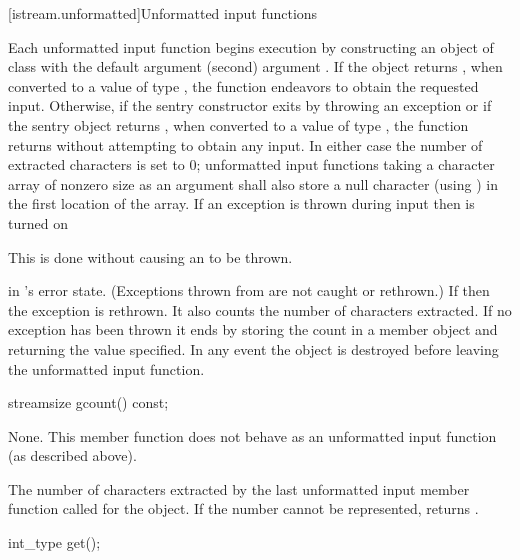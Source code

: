 [istream.unformatted]{Unformatted input functions}

\pnum
Each unformatted input function begins execution by constructing an object of class
with the default argument
(second) argument
.
If the
object returns
,
when converted to a value of type
,
the function endeavors
to obtain the requested input.
Otherwise, if the sentry constructor exits by throwing an exception or if
the sentry object returns , when converted to a value of type
,
the function returns without attempting to obtain any input.
In either case the number of extracted characters is set to 0;
unformatted input functions taking a character array of nonzero size as
an argument shall also store a null character (using
)
in the first location of the array.
If an exception is thrown during input then
is turned on
\begin{footnote}
This is done without causing an
to be thrown.
\end{footnote}
in
's
error state.
(Exceptions thrown from
are not caught or rethrown.)
If
then the exception is rethrown.
It also counts the number of characters extracted.
If no exception has been thrown it ends
by storing the count in a member object
and returning the value specified.
In any event the
object
is destroyed before leaving the unformatted input function.

%
\begin{itemdecl}
streamsize gcount() const;
\end{itemdecl}

\begin{itemdescr}
\pnum
\effects
None.
This member function does not behave as an unformatted
input function (as described above).

\pnum
\returns
The number of characters
extracted by the last unformatted input member function called for the object.
If the number cannot be represented,
returns .
\end{itemdescr}

%
\begin{itemdecl}
int_type get();
\end{itemdecl}

